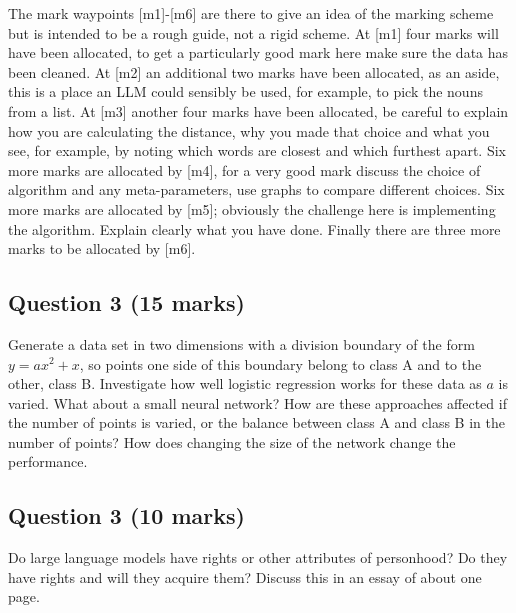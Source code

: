 \documentclass[12pt]{article}
\begin{document}
The mark waypoints [m1]-[m6] are there to give an idea of the marking
scheme but is intended to be a rough guide, not a rigid scheme. At
[m1] four marks will have been allocated, to get a particularly good
mark here make sure the data has been cleaned. At [m2] an additional
two marks have been allocated, as an aside, this is a place an LLM
could sensibly be used, for example, to pick the nouns from a list. At
[m3] another four marks have been allocated, be careful to explain how
you are calculating the distance, why you made that choice and what
you see, for example, by noting which words are closest and which
furthest apart. Six more marks are allocated by [m4], for a very
good mark discuss the choice of algorithm and any meta-parameters, use
graphs to compare different choices. Six more marks are allocated by
[m5]; obviously the challenge here is implementing the
algorithm. Explain clearly what you have done. Finally there are three
more marks to be allocated by [m6].

\subsection*{Question 3 (15 marks)}

Generate a data set in two dimensions with a division boundary of the
form $y=ax^2+x$, so points one side of this boundary belong to class A
and to the other, class B. Investigate how well logistic regression
works for these data as $a$ is varied. What about a small neural
network? How are these approaches affected if the number of points is
varied, or the balance between class A and class B in the number of
points? How does changing the size of the network change the performance.


\subsection*{Question 3 (10 marks)}

Do large language models have rights or other attributes of
personhood? Do they have rights and will they acquire them? Discuss this in an essay of about one page.
\end{document}
